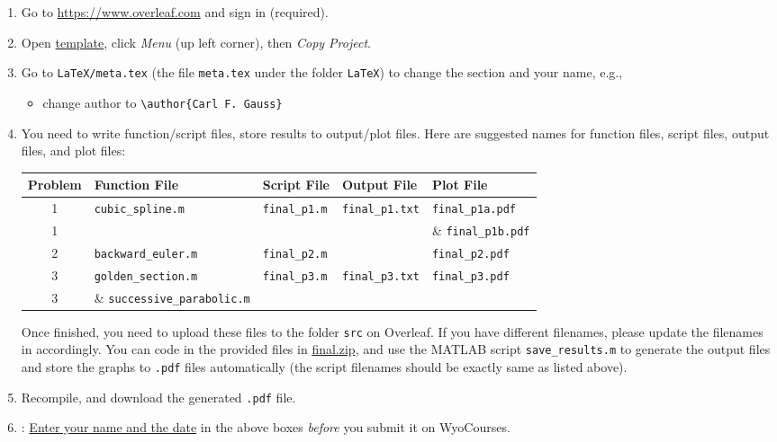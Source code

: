 \begin{enumerate}[label={\arabic*.}]
  \item Go to \url{https://www.overleaf.com} and sign in (required).
  \item Open \href{https://www.overleaf.com/read/jkcmttjccbdc}{template}, click \emph{Menu} (up left corner), then \emph{Copy Project}.
  \item Go to \verb|LaTeX/meta.tex| (the file \verb|meta.tex| under the folder \verb|LaTeX|) to change the section and your name, e.g.,
    \begin{itemize}
      \item change author to \verb|\author{Carl F. Gauss}|
    \end{itemize}
  \item You need to write function/script files, store results to output/plot files. Here are suggested names for function files, script files, output files, and plot files:
    \begin{table}[!hbtp]
      \centering
      \begin{tabular}{cllll}
        \toprule
        Problem & Function File                    & Script File                   & Output File         & Plot File               \\
        \midrule
        1       & \verb|cubic_spline.m|            & \verb|final_p1.m|             & \verb|final_p1.txt| & \verb|final_p1a.pdf|    \\
        1       &                                  &                               &                     & \& \verb|final_p1b.pdf| \\
        2       & \verb|backward_euler.m|       & \verb|final_p2.m|             &                     & \verb|final_p2.pdf|     \\
        3       & \verb|golden_section.m|          & \verb|final_p3.m|             & \verb|final_p3.txt| & \verb|final_p3.pdf|     \\
        3       & \& \verb|successive_parabolic.m| &                               &                     &                         \\
        \bottomrule
      \end{tabular}
    \end{table}

    Once finished, you need to upload these files to the folder \verb|src| on Overleaf. If you have different filenames, please update the filenames in \verb|| accordingly. You can code in the provided files in \href{https://libaoj.in/courses/2021s/MATH3340/final.zip}{final.zip}, and use the MATLAB script \verb|save_results.m| to generate the output files and store the graphs to \verb|.pdf| files automatically (the script filenames should be exactly same as listed above).
  \item Recompile, and download the generated \verb|.pdf| file.
  \item \textbf{\color{red}{Important}}: \underline{Enter your name and the date} in the above boxes \emph{before} you submit it on WyoCourses.
\end{enumerate}

